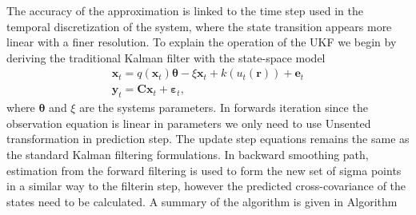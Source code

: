 \documentclass[12pt]{iopart}		%
\begin{document}
 The accuracy of the approximation is linked to the time step used in the temporal discretization of the system, where the state transition appears more linear with a finer resolution. To explain the operation of the UKF we begin by deriving the traditional Kalman filter with the state-space model
\begin{eqnarray}
	\mathbf{x}_t = q(\mathbf{x}_t)\boldsymbol{\theta} - \xi\mathbf{x}_t + k\left(u_t\left(\mathbf{r}\right)\right) + \mathbf{e}_t \\
	\mathbf{y}_t = \mathbf{C}\mathbf{x}_t + \boldsymbol{\varepsilon}_t,
\end{eqnarray}
where $\boldsymbol{\theta}$ and $\xi$ are the systems parameters. In forwards iteration since the observation equation is linear in parameters we only need to use Unsented transformation in prediction step. The update step equations remains the same as the standard Kalman filtering formulations. In backward smoothing path, estimation from the forward filtering is used to form the new set of sigma points in a similar way to the filterin step, however the predicted cross-covariance of the states need to be calculated. A summary of the algorithm is given in Algorithm 
\end{document}
